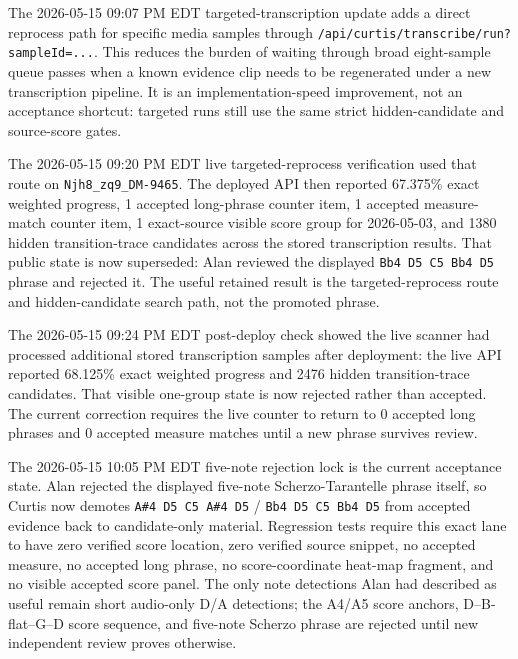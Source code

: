 \documentclass[12pt,letterpaper]{article}
\begin{document}
The 2026-05-15 09:07 PM EDT targeted-transcription update adds a direct reprocess path for specific media samples through \texttt{/api/curtis/transcribe/run?sampleId=...}. This reduces the burden of waiting through broad eight-sample queue passes when a known evidence clip needs to be regenerated under a new transcription pipeline. It is an implementation-speed improvement, not an acceptance shortcut: targeted runs still use the same strict hidden-candidate and source-score gates.

The 2026-05-15 09:20 PM EDT live targeted-reprocess verification used that route on \texttt{Njh8\_zq9\_DM-9465}. The deployed API then reported 67.375\% exact weighted progress, 1 accepted long-phrase counter item, 1 accepted measure-match counter item, 1 exact-source visible score group for 2026-05-03, and 1380 hidden transition-trace candidates across the stored transcription results. That public state is now superseded: Alan reviewed the displayed \texttt{Bb4 D5 C5 Bb4 D5} phrase and rejected it. The useful retained result is the targeted-reprocess route and hidden-candidate search path, not the promoted phrase.

The 2026-05-15 09:24 PM EDT post-deploy check showed the live scanner had processed additional stored transcription samples after deployment: the live API reported 68.125\% exact weighted progress and 2476 hidden transition-trace candidates. That visible one-group state is now rejected rather than accepted. The current correction requires the live counter to return to 0 accepted long phrases and 0 accepted measure matches until a new phrase survives review.

The 2026-05-15 10:05 PM EDT five-note rejection lock is the current acceptance state. Alan rejected the displayed five-note Scherzo-Tarantelle phrase itself, so Curtis now demotes \texttt{A\#4 D5 C5 A\#4 D5} / \texttt{Bb4 D5 C5 Bb4 D5} from accepted evidence back to candidate-only material. Regression tests require this exact lane to have zero verified score location, zero verified source snippet, no accepted measure, no accepted long phrase, no score-coordinate heat-map fragment, and no visible accepted score panel. The only note detections Alan had described as useful remain short audio-only D/A detections; the A4/A5 score anchors, D--B-flat--G--D score sequence, and five-note Scherzo phrase are rejected until new independent review proves otherwise.
\end{document}
